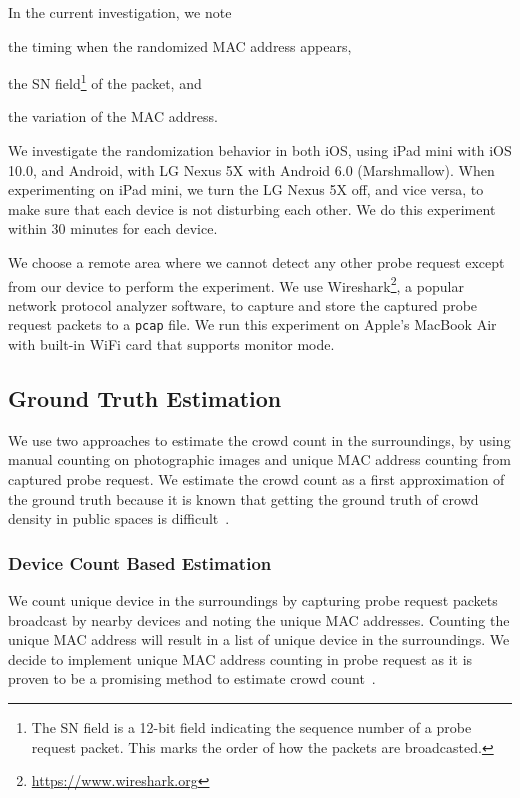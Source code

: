 In the current investigation, we note 
\begin{enumerate*}[label={\alph*)},font={\color{red!50!black}\bfseries}]
  \item the timing when the randomized MAC address appears,
  \item the \ac{SN} field\footnote{The \ac{SN} field is a 12-bit field indicating the sequence number of a probe request packet. This marks the order of how the packets are broadcasted.} of the packet, and
  \item the variation of the \ac{MAC} address.
\end{enumerate*}

We investigate the randomization behavior in both iOS, using iPad mini with iOS 10.0, and Android, with LG Nexus 5X with Android 6.0 (Marshmallow). When experimenting on iPad mini, we turn the LG Nexus 5X off, and vice versa, to make sure that each device is not disturbing each other. We do this experiment within 30 minutes for each device.

We choose a remote area where we cannot detect any other probe request except from our device to perform the experiment. We use Wireshark\footnote{\url{https://www.wireshark.org}}, a popular network protocol analyzer software, to capture and store the captured probe request packets to a \verb|pcap| file. We run this experiment on Apple's MacBook Air with built-in WiFi card that supports monitor mode.

\subsection{Ground Truth Estimation} %
\label{sub:social_density_estimation}
We use two approaches to estimate the crowd count in the surroundings, by using manual counting on photographic images and unique \ac{MAC} address counting from captured probe request. We estimate the crowd count as a first approximation of the ground truth because it is known that getting the ground truth of crowd density in public spaces is difficult~\cite{thesis041}.

	\subsubsection{Device Count Based Estimation} %
	\label{ssub:probe_request_based_estimation}
	We count unique device in the surroundings by capturing probe request packets broadcast by nearby devices and noting the unique \ac{MAC} addresses. Counting the unique \ac{MAC} address will result in a list of unique device in the surroundings. We decide to implement unique \ac{MAC} address counting in probe request as it is proven to be a promising method to estimate crowd count~\cite{thesis047}.


